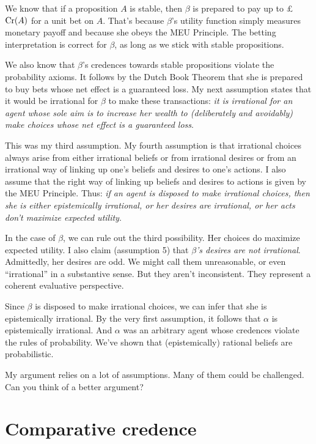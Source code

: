 We know that if a proposition $A$ is stable, then $\beta$ is prepared to pay up
to £$\text{Cr}(A)$ for a unit bet on $A$. That's because $\beta$'s utility function
simply measures monetary payoff and because she obeys the MEU Principle. The
betting interpretation is correct for $\beta$, as long as we stick with stable
propositions.

We also know that $\beta$'s credences towards stable propositions violate the
probability axioms. It follows by the Dutch Book Theorem that she is prepared to
buy bets whose net effect is a guaranteed loss. My next assumption states
that it would be irrational for $\beta$ to make these transactions: \emph{it is
  irrational for an agent whose sole aim is to increase her wealth to
  (deliberately and avoidably) make choices whose net effect is a guaranteed
  loss}.

This was my third assumption. My fourth assumption is that irrational choices
always arise from either irrational beliefs or from irrational desires or from
an irrational way of linking up one's beliefs and desires to one's actions. I
also assume that the right way of linking up beliefs and desires to actions is
given by the MEU Principle. Thus: \emph{if an agent is disposed to make
  irrational choices, then she is either epistemically irrational, or her
  desires are irrational, or her acts don't maximize expected utility}.

In the case of $\beta$, we can rule out the third possibility. Her choices do
maximize expected utility. I also claim (assumption 5) that \emph{$\beta$'s
  desires are not irrational}. Admittedly, her desires are odd. We might call
them unreasonable, or even ``irrational'' in a substantive sense. But they
aren't inconsistent. They represent a coherent evaluative perspective.

Since $\beta$ is disposed to make irrational choices, we can infer that she is
epistemically irrational. By the very first assumption, it follows that $\alpha$
is epistemically irrational. And $\alpha$ was an arbitrary agent whose credences
violate the rules of probability. We've shown that (epistemically) rational
beliefs are probabilistic.

My argument relies on a lot of assumptions. Many of them could be challenged.
Can you think of a better argument?

\section{Comparative credence}\label{sec:comparative-credence}

